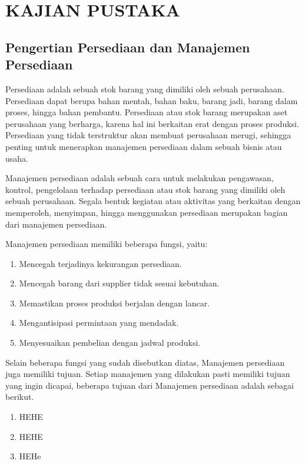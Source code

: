 
\chapter{KAJIAN PUSTAKA} 

\section{Pengertian Persediaan dan Manajemen Persediaan}

Persediaan adalah sebuah stok barang yang dimiliki oleh sebuah perusahaan. Persediaan dapat berupa bahan mentah, bahan baku, barang jadi, barang dalam proses, hingga bahan pembantu. Persediaan atau stok barang merupakan aset perusahaan yang berharga, karena hal ini berkaitan erat dengan proses produksi. Persediaan yang tidak terstruktur akan membuat perusahaan merugi, sehingga penting untuk menerapkan manajemen persediaan dalam sebuah bisnis atau usaha.

Manajemen persediaan adalah sebuah cara untuk melakukan pengawasan, kontrol, pengelolaan terhadap persediaan atau stok barang yang dimiliki oleh sebuah perusahaan. Segala bentuk kegiatan atau aktivitas yang berkaitan dengan memperoleh, menyimpan, hingga menggunakan persediaan merupakan bagian dari manajemen persediaan.

Manajemen persediaan memiliki beberapa fungsi, yaitu:
\begin{enumerate}
	\item Mencegah terjadinya kekurangan persediaan.
	\item Mencegah barang dari supplier tidak sesuai kebutuhan.
	\item Memastikan proses produksi berjalan dengan lancar.
	\item Mengantisipasi permintaan yang mendadak.
	\item Menyesuaikan pembelian dengan jadwal produksi.
\end{enumerate}

Selain beberapa fungsi yang sudah disebutkan diatas, Manajemen persediaan juga memiliki tujuan. Setiap manajemen yang dilakukan pasti memiliki tujuan yang ingin dicapai, beberapa tujuan dari Manajemen persediaan adalah sebagai berikut.
\begin{enumerate}
	\item HEHE
	\item HEHE
	\item HEHe
\end{enumerate}

